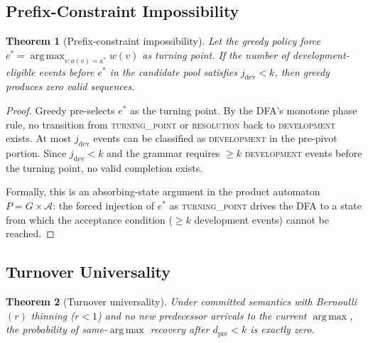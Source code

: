 \documentclass[11pt]{article}
\theoremstyle{plain}
\newtheorem{theorem}{Theorem}[section]
\theoremstyle{definition}
\theoremstyle{remark}
\newcommand{\dpre}[1][]{d_{\mathrm{pre}#1}}
\newcommand{\jdev}{{j_{\mathrm{dev}}}}
\DeclareMathOperator*{\argmax}{arg\,max}
\begin{document}
\subsection{Prefix-Constraint Impossibility}

\begin{theorem}[Prefix-constraint impossibility]
\label{thm:prefix-impossibility}
Let the greedy policy force
$e^* = \argmax_{v : a(v)=a^*} w(v)$ as turning point.  If the number
of development-eligible events before $e^*$ in the candidate pool
satisfies $\jdev < k$, then greedy produces zero valid sequences.
\end{theorem}

\begin{proof}
Greedy pre-selects $e^*$ as the turning point.  By the DFA's monotone
phase rule, no transition from \textsc{turning\_point} or
\textsc{resolution} back to \textsc{development} exists.  At most
$\jdev$ events can be classified as \textsc{development} in the
pre-pivot portion.  Since $\jdev < k$ and the grammar requires $\ge k$
\textsc{development} events before the turning point, no valid
completion exists.

Formally, this is an absorbing-state argument in the product automaton
$P = G \times \mathcal{A}$: the forced injection of $e^*$ as
\textsc{turning\_point} drives the DFA to a state from which the
acceptance condition ($\ge k$ development events) cannot be reached.
\end{proof}

\subsection{Turnover Universality}

\begin{theorem}[Turnover universality]\label{thm:turnover}
Under committed semantics with Bernoulli$(r)$ thinning ($r < 1$) and
no new predecessor arrivals to the current $\argmax$, the probability of
same-$\argmax$ recovery after $\dpre < k$ is exactly zero.
\end{theorem}
\end{document}
